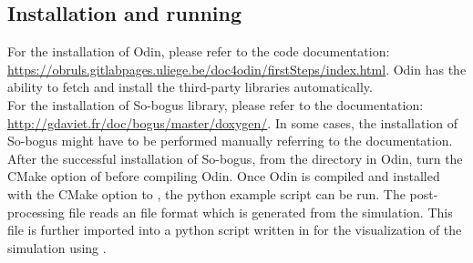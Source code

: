 \subsection{Installation and running}
For the installation of Odin, please refer to the code documentation: \url{https://obruls.gitlabpages.uliege.be/doc4odin/firstSteps/index.html}. Odin has the ability to fetch and install the third-party libraries automatically.\\

For the installation of So-bogus library, please refer to the documentation: \url{http://gdaviet.fr/doc/bogus/master/doxygen/}. In some cases, the installation of So-bogus might have to be performed manually referring to the documentation. After the successful installation of So-bogus, from the  directory in Odin, turn  the CMake option of  before compiling Odin. Once Odin is compiled and installed with the CMake option  to , the python example script can be run. The post-processing file reads an  file format which is generated from the simulation. This  file is further imported into a python script written in  for the visualization of the simulation using .

